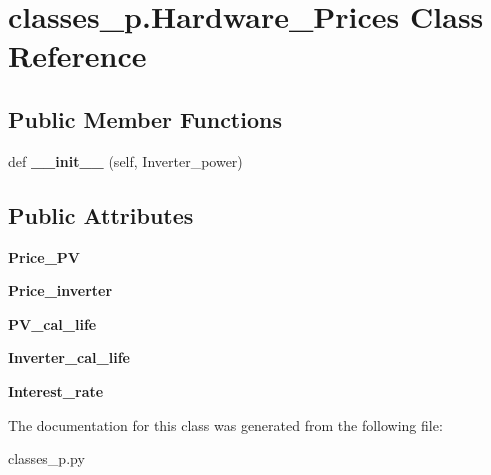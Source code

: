 \hypertarget{classclasses__p_1_1_hardware___prices}{}\section{classes\+\_\+p.\+Hardware\+\_\+\+Prices Class Reference}
\label{classclasses__p_1_1_hardware___prices}
\subsection*{Public Member Functions}
\begin{DoxyCompactItemize}
\item 
\mbox{\label{classclasses__p_1_1_hardware___prices_a97603af4d16bcfd18f548039fdc20349}} 
def {\bfseries \+\_\+\+\_\+init\+\_\+\+\_\+} (self, Inverter\+\_\+power)
\end{DoxyCompactItemize}
\subsection*{Public Attributes}
\begin{DoxyCompactItemize}
\item 
\mbox{\label{classclasses__p_1_1_hardware___prices_a0ad84fdac9759dc425304f97caa81e2a}} 
{\bfseries Price\+\_\+\+PV}
\item 
\mbox{\label{classclasses__p_1_1_hardware___prices_ae77a7ea185ab608df408ca3da3f685a9}} 
{\bfseries Price\+\_\+inverter}
\item 
\mbox{\label{classclasses__p_1_1_hardware___prices_a03b89d701ca8d52bc7901e2066064c6c}} 
{\bfseries P\+V\+\_\+cal\+\_\+life}
\item 
\mbox{\label{classclasses__p_1_1_hardware___prices_aae2bbaea8388f2b365f5090a95409dec}} 
{\bfseries Inverter\+\_\+cal\+\_\+life}
\item 
\mbox{\label{classclasses__p_1_1_hardware___prices_a0582b78a0202bd66b0269f7b8fa8048d}} 
{\bfseries Interest\+\_\+rate}
\end{DoxyCompactItemize}


The documentation for this class was generated from the following file\+:\begin{DoxyCompactItemize}
\item 
classes\+\_\+p.\+py\end{DoxyCompactItemize}
